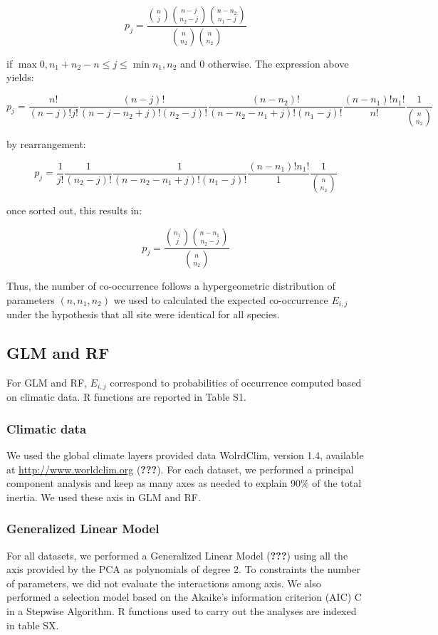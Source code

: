 \[ p_j= \frac{\binom{n}{j} \binom{n-j}{n_2-j} \binom{n-n_2}{n_1-j}}{\binom{n}{n_2} \binom{n}{n_2}} \]

if \(\max{0, n_1+n_2-n} \leq j \leq \min{n_1, n_2}\) and 0 otherwise.
The expression above yields:

\[ p_j= \frac{n!}{(n-j)!j!} \frac{(n-j)!}{(n-j-n_2+j)!(n_2-j)!} \frac{(n-n_2)!}{(n-n_2-n_1+j)!(n_1-j)!} \frac{(n-n_1)!n_1!}{n!} \frac{1}{\binom{n}{n_2}} \]

by rearrangement:

\[ p_j= \frac{1}{j!} \frac{1}{(n_2-j)!} \frac{1}{(n-n_2-n_1+j)!(n_1-j)!} \frac{(n-n_1)!n_1!}{1} \frac{1}{\binom{n}{n_2}} \]

once sorted out, this results in:

\[ p_j= \frac{\binom{n_1}{j} \binom{n-n_1}{n_2-j}}{\binom{n}{n_2}} \]

Thus, the number of co-occurrence follows a hypergeometric distribution
of parameters \((n,n_1,n_2)\) we used to calculated the expected
co-occurrence \(E_{i,j}\) under the hypothesis that all site were
identical for all species.

\subsection{GLM and RF}\label{glm-and-rf}

For GLM and RF, \(E_{i,j}\) correspond to probabilities of occurrence
computed based on climatic data. R functions are reported in Table S1.

\subsubsection{Climatic data}\label{climatic-data}

We used the global climate layers provided data WolrdClim, version 1.4,
available at \url{http://www.worldclim.org} ({\textbf{???}}). For each
dataset, we performed a principal component analysis and keep as many
axes as needed to explain 90\% of the total inertia. We used these axis
in GLM and RF.

\subsubsection{Generalized Linear Model}\label{generalized-linear-model}

For all datasets, we performed a Generalized Linear Model
({\textbf{???}}) using all the axis provided by the PCA as polynomials
of degree 2. To constraints the number of parameters, we did not
evaluate the interactions among axis. We also performed a selection
model based on the Akaike's information criterion (AIC) C in a Stepwise
Algorithm. R functions used to carry out the analyses are indexed in
table SX.

